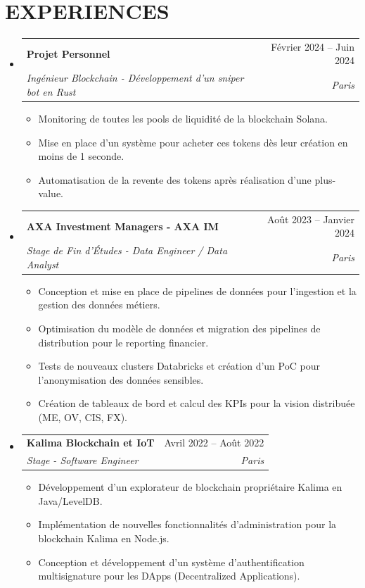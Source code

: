 \documentclass[11pt,a4paper]{article}
\makeatletter
\newcommand{\resumeItem}[1]{
  \item\footnotesize{
    {#1 \vspace{-1pt}}
  }
}
\newcommand{\resumeSubheading}[4]{
  \vspace{2pt}\item
    \begin{tabular*}{\textwidth}[t]{l@{\extracolsep{\fill}}r}
      {\footnotesize\textbf{#1}} & {\footnotesize#2} \\
      {\footnotesize\textit{#3}} & {\footnotesize\textit{#4}} \\
    \end{tabular*}\vspace{2pt}
}
\newcommand{\resumeSubHeadingListStart}{\begin{itemize}[leftmargin=0in, label={}]}
\newcommand{\resumeSubHeadingListEnd}{\end{itemize}}
\newcommand{\resumeItemListStart}{\begin{itemize}[label={\textbullet}]}
\newcommand{\resumeItemListEnd}{\end{itemize}\vspace{0pt}}
\makeatother
\begin{document}
\section{EXPERIENCES}
\resumeSubHeadingListStart
    \resumeSubheading
      {Projet Personnel}{Février 2024 -- Juin 2024}
      {Ingénieur Blockchain - Développement d'un sniper bot en Rust}{Paris}
      \resumeItemListStart
        \resumeItem{Monitoring de toutes les pools de liquidité de la blockchain Solana.}
        \resumeItem{Mise en place d'un système pour acheter ces tokens dès leur création en moins de 1 seconde.}
        \resumeItem{Automatisation de la revente des tokens après réalisation d'une plus-value.}
      \resumeItemListEnd
    \resumeSubheading
      {AXA Investment Managers - AXA IM}{Août 2023 -- Janvier 2024}
      {Stage de Fin d'Études - Data Engineer / Data Analyst}{Paris}
      \resumeItemListStart
        \resumeItem{Conception et mise en place de pipelines de données pour l'ingestion et la gestion des données métiers.}
        \resumeItem{Optimisation du modèle de données et migration des pipelines de distribution pour le reporting financier.}
        \resumeItem{Tests de nouveaux clusters Databricks et création d'un PoC pour l'anonymisation des données sensibles.}
        \resumeItem{Création de tableaux de bord et calcul des KPIs pour la vision distribuée (ME, OV, CIS, FX).}
      \resumeItemListEnd
    \resumeSubheading
      {Kalima Blockchain et IoT}{Avril 2022 -- Août 2022}
      {Stage - Software Engineer}{Paris}
      \resumeItemListStart
        \resumeItem{Développement d'un explorateur de blockchain propriétaire Kalima en Java/LevelDB.}
        \resumeItem{Implémentation de nouvelles fonctionnalités d'administration pour la blockchain Kalima en Node.js.}
        \resumeItem{Conception et développement d'un système d'authentification multisignature pour les DApps (Decentralized Applications).}
      \resumeItemListEnd
  \resumeSubHeadingListEnd
\end{document}
